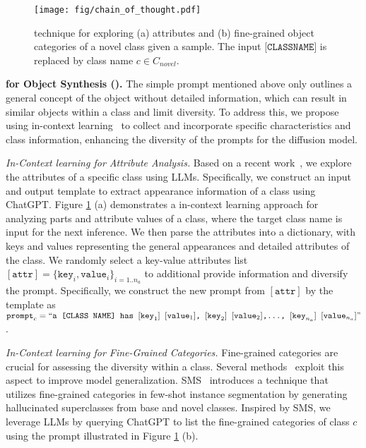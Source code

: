 \begin{figure}[t]
    \centering
    \texttt{[image: fig/chain\_of\_thought.pdf]}
    \caption{ technique for exploring (a) attributes and (b) fine-grained object categories of a novel class given a sample. The input $\texttt{[CLASSNAME]}$ is replaced by class name $c \in C_{novel}$.}
     \label{fig:chain-of-thought}
\end{figure}
\textbf{ for Object Synthesis ().} The simple prompt mentioned above only outlines a general concept of the object without detailed information, which can result in similar objects within a class and limit diversity. To address this, we propose using in-context learning~\citep{reynolds2021prompt} to  collect and incorporate specific characteristics and class information, enhancing the diversity of the prompts for the diffusion model.

\textit{In-Context learning for Attribute Analysis.} Based on a recent work~\citep{zhu2024llafs}, we explore the attributes of a specific class using LLMs. Specifically, we construct an input and output template to extract appearance information of a class using ChatGPT. Figure \ref{fig:chain-of-thought} (a) demonstrates a in-context learning approach for analyzing parts and attribute values of a class, where the target class name is input for the next inference. We then parse the attributes into a dictionary, with keys and values representing the general appearances and detailed attributes of the class. We randomly select a key-value attributes list $[\texttt{attr}]=\{\texttt{key}_i, \texttt{value}_i\}_{i=1..{n_a}}$ to additional provide information and diversify the prompt. Specifically, we construct the new prompt from $[\texttt{attr}]$ by the template as $\texttt{prompt}_c = ``\texttt{a [CLASS NAME] has $[\texttt{key}_1]$ $[\texttt{value}_1]$, $[\texttt{key}_2]$ $[\texttt{value}_2]$,..., $[\texttt{key}_{n_a}]$ $[\texttt{value}_{n_a}]$}"$.

\textit{In-Context learning  for Fine-Grained Categories.} Fine-grained categories are crucial for assessing the diversity within a class. Several methods~\citep{vu2023instance, wu2024detail} exploit this aspect to improve model generalization. SMS~\citep{vu2023instance} introduces a technique that utilizes fine-grained categories in few-shot instance segmentation by generating hallucinated superclasses from base and novel classes. Inspired by SMS, we leverage LLMs by querying ChatGPT to list the fine-grained categories of class $c$ using the prompt illustrated in Figure \ref{fig:chain-of-thought} (b).

